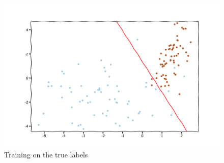 \begin{answer}
  \begin{figure}[htpb]
    \centering
    \includegraphics[width=0.8\linewidth]{posonly/posonly_all_observed.png}
    \caption{Training on the true labels}%
    \label{fig:name}
  \end{figure}
\end{answer}

